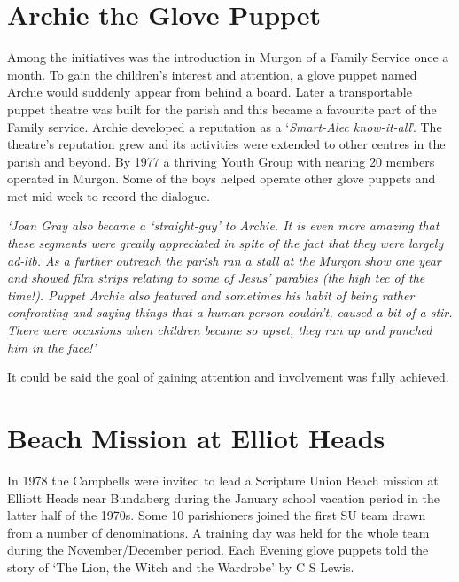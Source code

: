 \section{Archie the Glove Puppet}



Among the initiatives was the introduction in Murgon of a Family Service once a month. To gain the children's interest and attention, a glove puppet named Archie would suddenly appear from behind a board. Later a transportable puppet theatre was built for the parish and this became a favourite part of the Family service. Archie developed a reputation as a `\emph{Smart-Alec know-it-all}'. The theatre's reputation grew and its activities were extended to other centres in the parish and beyond. By 1977 a thriving Youth Group with nearing 20 members operated in Murgon. Some of the boys helped operate other glove puppets and met mid-week to record the dialogue\emph{.}



\emph{`Joan Gray also became a `straight-guy' to Archie. It is even more amazing that these segments were greatly appreciated in spite of the fact that they were largely ad-lib. As a further outreach the parish ran a stall at the Murgon show one year and showed film strips relating to some of Jesus' parables (the high tec of the time!). Puppet Archie also featured and sometimes his habit of being rather confronting and saying things that a human person couldn't, caused a bit of a stir. There were occasions when children became so upset, they ran up and punched him in the face!'}



It could be said the goal of gaining attention and involvement was fully achieved.



\section{Beach Mission at Elliot Heads}



In 1978 the Campbells were invited to lead a Scripture Union Beach mission at Elliott Heads near Bundaberg during the January school vacation period in the latter half of the 1970s. Some 10 parishioners joined the first SU team drawn from a number of denominations. A training day was held for the whole team during the November/December period. Each Evening glove puppets told the story of `The Lion, the Witch and the Wardrobe' by C S Lewis.




